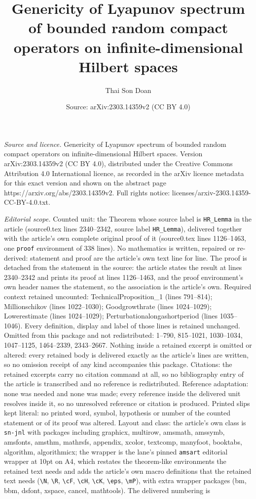 \documentclass[10pt,a4paper]{amsart}
\title[Genericity of Lyapunov spectrum of bounded random compact op]{Genericity of Lyapunov spectrum of bounded random compact operators on infinite-dimensional Hilbert spaces}
\author{Thai Son Doan}
\date{Source: arXiv:2303.14359v2 (CC BY 4.0)}
\begin{document}
\maketitle

\noindent\emph{Source and licence.} Genericity of Lyapunov spectrum of bounded random compact operators on infinite-dimensional Hilbert spaces. Version arXiv:2303.14359v2 (CC BY 4.0), distributed under the Creative Commons Attribution 4.0 International licence, as recorded in the arXiv licence metadata for this exact version and shown on the abstract page https://arxiv.org/abs/2303.14359v2. Full rights notice: licenses/arxiv-2303.14359-CC-BY-4.0.txt.\par\smallskip

\noindent\textit{Editorial scope.} Counted unit: the Theorem whose source label is \texttt{HR\_Lemma} in the article (source0.tex lines 2340--2342, source label \texttt{HR\_Lemma}), delivered together with the article's own complete original proof of it (source0.tex lines 1126--1463, one \texttt{proof} environment of 338 lines). No mathematics is written, repaired or re-derived: statement and proof are the article's own text line for line. The proof is detached from the statement in the source: the article states the result at lines 2340--2342 and prints its proof at lines 1126--1463, and the proof environment's own header names the statement, so the association is the article's own. Required context retained uncounted: TechnicalProposition\_1 (lines 791--814); Millionschikov (lines 1022--1030); Goodgrowthrate (lines 1024--1029); Lowerestimate (lines 1024--1029); Perturbationalongashortperiod (lines 1035--1046). Every definition, display and label of those lines is retained unchanged. Omitted from this package and not redistributed: 1--790, 815--1021, 1030--1034, 1047--1125, 1464--2339, 2343--2667. Nothing inside a retained excerpt is omitted or altered: every retained body is delivered exactly as the article's lines are written, so no omission receipt of any kind accompanies this package. Citations: the retained excerpts carry no citation command at all, so no bibliography entry of the article is transcribed and no reference is redistributed. Reference adaptation: none was needed and none was made; every reference inside the delivered unit resolves inside it, so no unresolved reference or citation is produced. Printed slips kept literal: no printed word, symbol, hypothesis or number of the counted statement or of its proof was altered. Layout and class: the article's own class is \texttt{sn-jnl} with packages including graphicx, multirow, amsmath, amssymb, amsfonts, amsthm, mathrsfs, appendix, xcolor, textcomp, manyfoot, booktabs, algorithm, algorithmicx; the wrapper is the lane's pinned \texttt{amsart} editorial wrapper at 10pt on A4, which restates the theorem-like environments the retained text needs and adds the article's own macro definitions that the retained text needs (\texttt{\textbackslash N}, \texttt{\textbackslash R}, \texttt{\textbackslash cF}, \texttt{\textbackslash cH}, \texttt{\textbackslash cK}, \texttt{\textbackslash eps}, \texttt{\textbackslash mP}), with extra wrapper packages (bm, bbm, dsfont, xspace, cancel, mathtools). The delivered numbering is 
\end{document}
